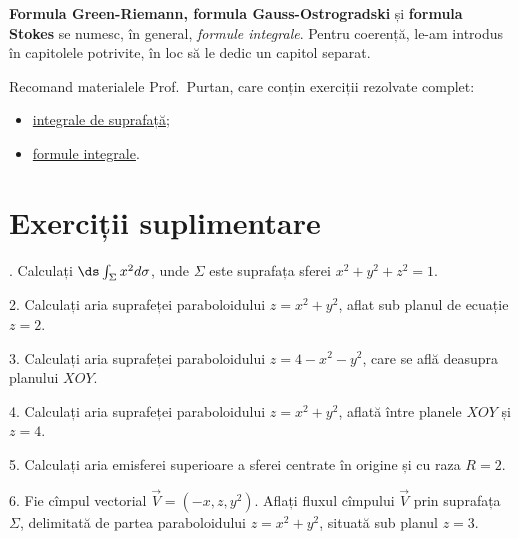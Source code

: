 \textbf{Formula Green-Riemann, formula Gauss-Ostrogradski} și \textbf{formula Stokes}
se numesc, în general, \emph{formule integrale}. Pentru coerență,
le-am introdus în capitolele potrivite, în loc să le dedic un capitol separat.

Recomand materialele Prof.\ Purtan, care conțin exerciții rezolvate complet:
\begin{itemize}
    \item \href{https://adrianmanea.xyz/docs/18-19-etti-am1/purtan-int-sup.pdf}{integrale de suprafață};
    \item \href{https://adrianmanea.xyz/docs/18-19-etti-am1/purtan-f-int.pdf}{formule integrale}.
\end{itemize}

\section{Exerciții suplimentare}

\indent{}. Calculați $ \ds\int_\Sigma x^2 d\sigma $, unde $ \Sigma $ este
suprafața sferei $ x^2 + y^2 + z^2 = 1 $.

\vspace{0.3cm}

2. Calculați aria suprafeței paraboloidului $ z = x^2 + y^2 $, aflat
sub planul de ecuație $ z = 2 $.

\vspace{0.3cm}

3. Calculați aria suprafeței paraboloidului $ z = 4 - x^2 - y^2 $,
care se află deasupra planului $ XOY $.

\vspace{0.3cm}

4. Calculați aria suprafeței paraboloidului $ z = x^2 + y^2 $,
aflată între planele $ XOY $ și $ z = 4 $.

\vspace{0.3cm}

5. Calculați aria emisferei superioare a sferei centrate în origine
și cu raza $ R = 2 $.

\vspace{0.3cm}

6. Fie cîmpul vectorial $ \vec{V} = (-x, z, y^2) $. Aflați fluxul
cîmpului $ \vec{V} $ prin suprafața $ \Sigma $, delimitată
de partea paraboloidului $ z = x^2 + y^2 $, situată sub planul $ z = 3 $.

\vspace{0.3cm}

